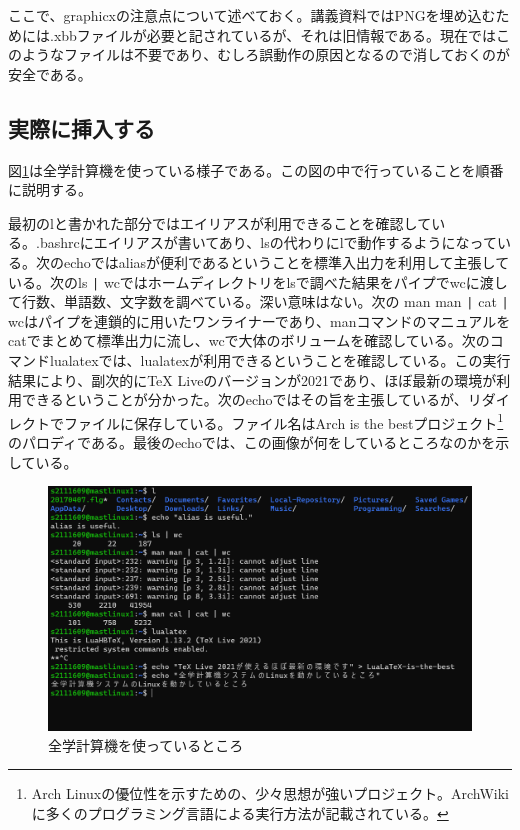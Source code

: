 \documentclass[dvipdfmx,12pt,a4j]{jarticle}
\begin{document}
ここで、graphicxの注意点について述べておく。講義資料ではPNGを埋め込むためには.xbbファイルが必要と記されているが、それは旧情報である。現在ではこのようなファイルは不要であり、むしろ誤動作の原因となるので消しておくのが安全である。\cite[p.126]{bibunsho}

\subsection{実際に挿入する}\label{subsection:実際に挿入する}
図\ref{fig:keisanki}は全学計算機を使っている様子である。この図の中で行っていることを順番に説明する。

最初のlと書かれた部分ではエイリアスが利用できることを確認している。.bashrcにエイリアスが書いてあり、lsの代わりにlで動作するようになっている。次のechoではaliasが便利であるということを標準入出力を利用して主張している。次のls \verb+|+ wcではホームディレクトリをlsで調べた結果をパイプでwcに渡して行数、単語数、文字数を調べている。深い意味はない。次の man man \verb+|+ cat \verb+|+ wcはパイプを連鎖的に用いたワンライナーであり、manコマンドのマニュアルをcatでまとめて標準出力に流し、wcで大体のボリュームを確認している。次のコマンドlualatexでは、lualatexが利用できるということを確認している。この実行結果により、副次的にTeX Liveのバージョンが2021であり、ほぼ最新の環境が利用できるということが分かった。次のechoではその旨を主張しているが、リダイレクトでファイルに保存している。ファイル名はArch is the bestプロジェクト\footnote{Arch Linuxの優位性を示すための、少々思想が強いプロジェクト。ArchWikiに多くのプログラミング言語による実行方法が記載されている。}のパロディである。最後のechoでは、この画像が何をしているところなのかを示している。
\begin{figure}[H]
  \centering
  \includegraphics[width=15cm]{imgs/commandline.png}
  \caption{全学計算機を使っているところ}
  \label{fig:keisanki}
\end{figure}
\end{document}
